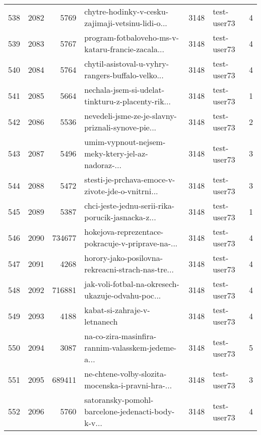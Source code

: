 \begin{tabular}{lrrlrlr}
538  &       2082 &     5769 &  chytre-hodinky-v-cesku-zajimaji-vetsinu-lidi-o... &     3148 &                  test-user73 &               4 \\
539  &       2083 &     5767 &  program-fotbaloveho-ms-v-kataru-francie-zacala... &     3148 &                  test-user73 &               4 \\
540  &       2084 &     5764 &  chytil-asistoval-u-vyhry-rangers-buffalo-velko... &     3148 &                  test-user73 &               4 \\
541  &       2085 &     5664 &  nechala-jsem-si-udelat-tinkturu-z-placenty-rik... &     3148 &                  test-user73 &               1 \\
542  &       2086 &     5536 &  nevedeli-jsme-ze-je-slavny-priznali-synove-pie... &     3148 &                  test-user73 &               2 \\
543  &       2087 &     5496 &  umim-vypnout-nejsem-meky-ktery-jel-az-nadoraz-... &     3148 &                  test-user73 &               3 \\
544  &       2088 &     5472 &  stesti-je-prchava-emoce-v-zivote-jde-o-vnitrni... &     3148 &                  test-user73 &               3 \\
545  &       2089 &     5387 &  chci-jeste-jednu-serii-rika-porucik-jasnacka-z... &     3148 &                  test-user73 &               1 \\
546  &       2090 &   734677 &  hokejova-reprezentace-pokracuje-v-priprave-na-... &     3148 &                  test-user73 &               4 \\
547  &       2091 &     4268 &  horory-jako-posilovna-rekreacni-strach-nas-tre... &     3148 &                  test-user73 &               4 \\
548  &       2092 &   716881 &  jak-voli-fotbal-na-okresech-ukazuje-odvahu-poc... &     3148 &                  test-user73 &               4 \\
549  &       2093 &     4188 &                       kabat-si-zahraje-v-letnanech &     3148 &                  test-user73 &               4 \\
550  &       2094 &     3087 &  na-co-zira-masinfira-rannim-valasskem-jedeme-a... &     3148 &                  test-user73 &               5 \\
551  &       2095 &   689411 &  ne-chtene-volby-slozita-mocenska-i-pravni-hra-... &     3148 &                  test-user73 &               3 \\
552  &       2096 &     5760 &  satoransky-pomohl-barcelone-jedenacti-body-k-v... &     3148 &                  test-user73 &               4 \\

\end{tabular}
